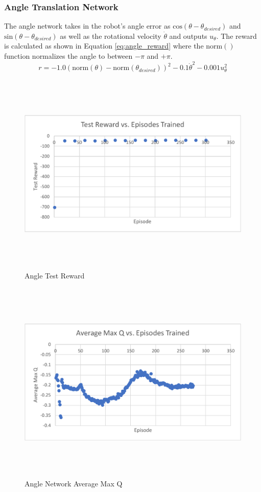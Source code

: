 \subsubsection{Angle Translation Network}
The angle network takes in the robot's angle error as $\text{cos}(\theta-\theta_{desired})$ and $\text{sin}(\theta-\theta_{desired})$ as well as the rotational velocity $\dot{\theta}$ and outputs $u_\theta$. The reward is calculated as shown in Equation \ref{eq:angle_reward} where the $\text{norm}()$ function normalizes the angle to between $-\pi$ and $+\pi$.
\begin{equation}
r = -1.0(\text{norm}(\theta)-\text{norm}(\theta_{desired}))^2-0.1\dot{\theta}^2-0.001u_\theta^2
\label{eq:angle_reward}
\end{equation}

\begin{figure}[H]
	\centering
	\includegraphics[width=6in, height=3.85in, keepaspectratio]{figures/train_figs/angle_r.pdf}
	\caption{Angle Test Reward} \label{fig:angle_r}
\end{figure}
\begin{figure}[H]
	\centering
	\includegraphics[width=6in, height=3.85in, keepaspectratio]{figures/train_figs/angle_q.pdf}
	\caption{Angle Network Average Max Q} \label{fig:angle_q}
\end{figure}

